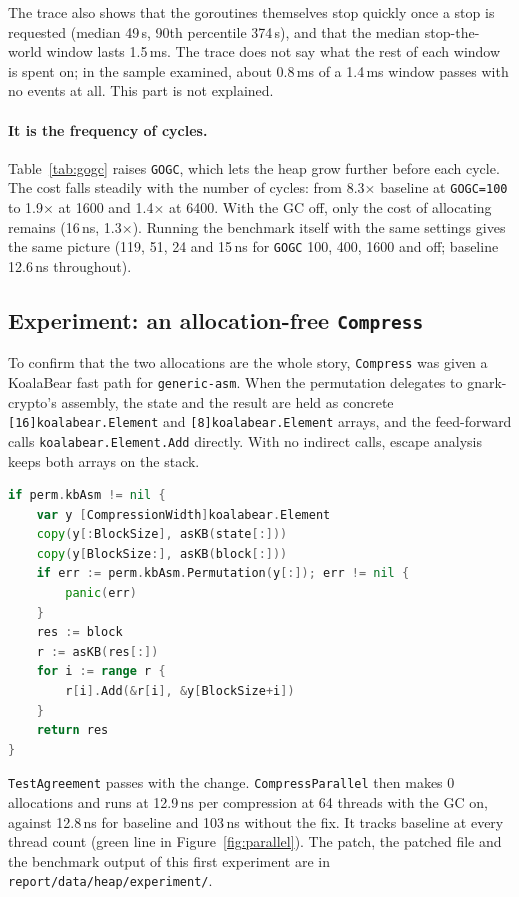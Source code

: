 \documentclass[10pt,a4paper]{article}
\begin{document}
The trace also shows that the goroutines themselves stop quickly once a stop is requested
(median 49\,\textmu s, 90th percentile 374\,\textmu s), and that the median stop-the-world
window lasts 1.5\,ms. The trace does not say what the rest of each window is spent on; in
the sample examined, about 0.8\,ms of a 1.4\,ms window passes with no events at all. This
part is not explained.




\paragraph{It is the frequency of cycles.} Table~\ref{tab:gogc} raises \texttt{GOGC}, which
lets the heap grow further before each cycle. The cost falls steadily with the number of
cycles: from 8.3$\times$ baseline at \texttt{GOGC=100} to 1.9$\times$ at 1600 and
1.4$\times$ at 6400. With the GC off, only the cost of allocating remains (16\,ns,
1.3$\times$). Running the benchmark itself with the same settings gives the same picture
(119, 51, 24 and 15\,ns for \texttt{GOGC} 100, 400, 1600 and off; baseline 12.6\,ns
throughout).

\subsection{Experiment: an allocation-free \texttt{Compress}}\label{sec:fix}

To confirm that the two allocations are the whole story, \texttt{Compress} was given a
KoalaBear fast path for \texttt{generic-asm}. When the permutation delegates to
gnark-crypto's assembly, the state and the result are held as concrete
\texttt{[16]koalabear.Element} and \texttt{[8]koalabear.Element} arrays, and the feed-forward
calls \texttt{koalabear.Element.Add} directly. With no indirect calls, escape analysis keeps
both arrays on the stack.
\begin{lstlisting}[language=Go,caption={The fast path added at the top of \texttt{Compress} (\texttt{report/data/heap/experiment/}).},label=lst:fastpath]
if perm.kbAsm != nil {
	var y [CompressionWidth]koalabear.Element
	copy(y[:BlockSize], asKB(state[:]))
	copy(y[BlockSize:], asKB(block[:]))
	if err := perm.kbAsm.Permutation(y[:]); err != nil {
		panic(err)
	}
	res := block
	r := asKB(res[:])
	for i := range r {
		r[i].Add(&r[i], &y[BlockSize+i])
	}
	return res
}
\end{lstlisting}
\texttt{TestAgreement} passes with the change. \texttt{CompressParallel} then makes
0 allocations and runs at 12.9\,ns per compression at 64 threads with the GC on, against
12.8\,ns for baseline and 103\,ns without the fix. It tracks baseline at every thread count
(green line in Figure~\ref{fig:parallel}). The patch, the patched file and the benchmark
output of this first experiment are in \texttt{report/data/heap/experiment/}.
\end{document}
